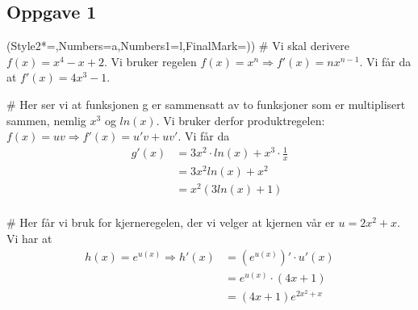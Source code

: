 \subsection*{Oppgave 1}
\begin{easylist}[enumerate]
	\ListProperties(Style2*=,Numbers=a,Numbers1=l,FinalMark={)})
	# Vi skal derivere $f(x) = x^4 - x +2$. Vi bruker regelen $f(x) = x^n \Rightarrow f'(x) = nx^{n-1}$. Vi får da at $f'(x) = 4x^3 - 1$.
	
	# Her ser vi at funksjonen g er sammensatt av to funksjoner som er multiplisert sammen, nemlig $x^3$ og $ln(x)$. Vi bruker derfor produktregelen: $f(x) = uv \Rightarrow f'(x) = u'v + uv'$. Vi får da 
	\begin{equation*}
		\begin{aligned}
			g'(x) &= 3x^2 \cdot ln(x) + x^3 \cdot \frac{1}{x}\\
					&= 3x^2ln(x) + x^2\\
					&= x^2(3ln(x)+1)\\
		\end{aligned}
	\end{equation*}
	
	# Her får vi bruk for kjerneregelen, der vi velger at kjernen vår er $u = 2x^2 + x$. Vi har at 
	\begin{equation*}
		\begin{aligned}
				h(x) = e^{u(x)} \Rightarrow h'(x) &= (e^{u(x)})' \cdot u'(x) \\
																  &= e^{u(x)} \cdot (4x + 1) \\
																  &= (4x +1)e^{2x^2 + x}
		\end{aligned}
	\end{equation*}
\end{easylist}


